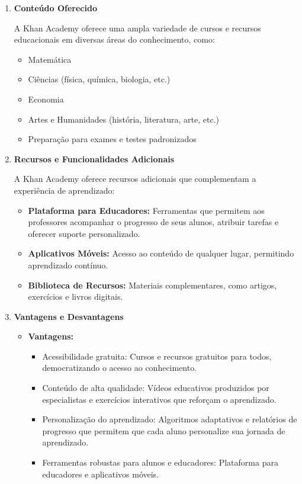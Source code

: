 \begin{itemize}
\begin{enumerate}
        \item \textbf{Conteúdo Oferecido}
        
        A Khan Academy oferece uma ampla variedade de cursos e recursos educacionais em diversas áreas do conhecimento, como:

        \begin{itemize}
            \item Matemática
            \item Ciências (física, química, biologia, etc.)
            \item Economia
            \item Artes e Humanidades (história, literatura, arte, etc.)
            \item Preparação para exames e testes padronizados
        \end{itemize}

        \item \textbf{Recursos e Funcionalidades Adicionais}
        
        A Khan Academy oferece recursos adicionais que complementam a experiência de aprendizado:

        \begin{itemize}
            \item \textbf{Plataforma para Educadores:} Ferramentas que permitem aos professores acompanhar o progresso de seus alunos, atribuir tarefas e oferecer suporte personalizado.
            \item \textbf{Aplicativos Móveis:} Acesso ao conteúdo de qualquer lugar, permitindo aprendizado contínuo.
            \item \textbf{Biblioteca de Recursos:} Materiais complementares, como artigos, exercícios e livros digitais.
        \end{itemize}

        \item \textbf{Vantagens e Desvantagens}

        \begin{itemize}
            \item \textbf{Vantagens:}
            \begin{itemize}
                \item Acessibilidade gratuita: Cursos e recursos gratuitos para todos, democratizando o acesso ao conhecimento.
                \item Conteúdo de alta qualidade: Vídeos educativos produzidos por especialistas e exercícios interativos que reforçam o aprendizado.
                \item Personalização do aprendizado: Algoritmos adaptativos e relatórios de progresso que permitem que cada aluno personalize sua jornada de aprendizado.
                \item Ferramentas robustas para alunos e educadores: Plataforma para educadores e aplicativos móveis.
            \end{itemize}


\end{itemize}
\end{enumerate}
\end{itemize}
